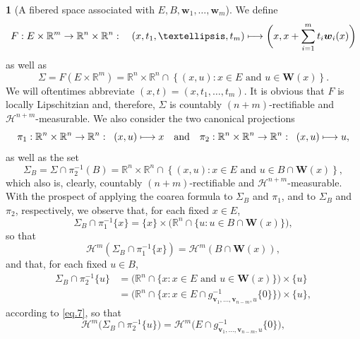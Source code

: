 \documentclass[11pt]{article}
\newcounter{cdrthm}[section]
\theoremstyle{definition}
\theoremstyle{jepanonymous}
\newtheorem{jepempty}[cdrthm]{}
\newenvironment{enonce}[2][remark]{\begin{jepempty}[#2]}{\end{jepempty}}
\theoremstyle{plain}
\newcommand\mto{\mathchoice{\longmapsto}{\mapsto}{\mapsto}{\mapsto}}
\newcommand{\quand}{\quad\text{and}\quad}
\newenvironment{Empty}[2][\null]{%
\begin{enonce}[remark]{#1}#2}
{\end{enonce}}
\newcommand{\R}{\mathbb{R}}
\newcommand{\Rm}{\R^m}
\newcommand{\Rn}{\R^n}
\newcommand{\calH}{\mathscr{H}}
\newcommand{\bW}{{\boldsymbol{W}}}
\newcommand{\bv}{{\boldsymbol{v}}}
\newcommand{\bw}{{\boldsymbol{w}}}
\begin{document}
\begin{Empty}[A fibered space associated with $E,B,\bw_1,\ldots,\bw_m$]
\label{fibration.1}
We define
\begin{equation*}
F: E \times \Rm \to \Rn \times \Rn:\quad (x,t_1,\ldots,t_m) \mto\biggl(x, x + \sum_{i=1}^m t_i \bw_i(x) \biggr)
\end{equation*}
as well as
\begin{equation*}
\Sigma = F(E \times \Rm) = \Rn \times \Rn \cap \left\{ (x,u): x \in E \text{ and } u \in \bW(x) \right\}.
\end{equation*}
We will oftentimes abbreviate $(x,t)=(x,t_1,\ldots,t_m)$.
It is obvious that $F$ is locally Lipschitzian and, therefore, $\Sigma$ is countably $(n+m)$-rectifiable and $\calH^{n+m}$-measurable.
We also consider the two canonical projections
\begin{equation*}
\pi_1: \Rn \times \Rn \to \Rn:\;\; (x,u) \mto x \quand \pi_2: \Rn \times \Rn \to \Rn:\;\; (x,u) \mto u,
\end{equation*}
as well as the set
\begin{equation*}
\Sigma_B = \Sigma \cap \pi_2^{-1}(B) = \Rn \times \Rn \cap \left\{ (x,u): x \in E \text{ and } u \in B \cap \bW(x) \right\},
\end{equation*}
which also is, clearly, countably $(n+m)$-rectifiable and $\calH^{n+m}$-measurable.
With the prospect of applying the coarea formula to $\Sigma_B$ and $\pi_1$, and to $\Sigma_B$ and $\pi_2$, respectively, we observe that, for each fixed $x \in E$,
\begin{equation*}
\Sigma_B \cap \pi_1^{-1}\{x\} = \{x\} \times \big(\Rn \cap \{ u: u \in B \cap \bW(x) \}\big),
\end{equation*}
so that
\begin{equation}
\label{eq.6}
\calH^m \left(\Sigma_B \cap \pi_1^{-1}\{x\} \right) = \calH^m(B \cap \bW(x)),
\end{equation}
and that, for each fixed $u \in B$,
\begin{equation*}
\begin{split}
\Sigma_B \cap \pi_2^{-1}\{u\} & = \big(\Rn \cap \{ x: x \in E \text{ and } u \in \bW(x) \} \big)\times \{u\}\\
& = \bigl(\Rn\cap\{ x: x \in E \cap g_{\bv_1,\ldots,\bv_{n-m},u}^{-1}\{0\}\} \bigr) \times \{u\},
\end{split}
\end{equation*}
according to \eqref{eq.7}, so that
\begin{equation}
\label{eq.8}
\calH^m \bigl(\Sigma_B \cap \pi_2^{-1}\{u\}\bigr) = \calH^m \bigl(E \cap g_{\bv_1,\ldots,\bv_{n-m},u}^{-1}\{0\}\bigr),

\end{equation}
\end{Empty}
\end{document}
